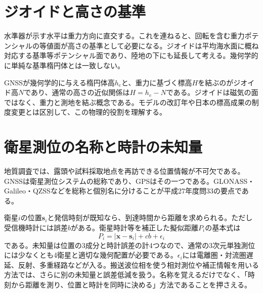 \section{ジオイドと高さの基準}
\label{theory:gravity:geoid}
水準器が示す水平は重力方向に直交する。これを連ねると、回転を含む重力ポテンシャルの等値面が高さの基準として必要になる。ジオイドは平均海水面に概ね対応する基準等ポテンシャル面であり、陸地の下にも延長して考える。幾何学的に単純な基準楕円体とは一致しない。

GNSSが幾何学的に与える楕円体高\(h_e\)と、重力に基づく標高\(H\)を結ぶのがジオイド高\(N\)であり、通常の高さの近似関係は\(H=h_e-N\)である。ジオイドは磁気の面ではなく、重力と測地を結ぶ概念である。モデルの改訂年や日本の標高成果の制度変更とは区別して、この物理的役割を理解する\cite{gsi_geoid}。

\section{衛星測位の名称と時計の未知量}
\label{theory:gravity:gnss}
地質調査では、露頭や試料採取地点を再訪できる位置情報が不可欠である。GNSSは衛星測位システムの総称であり、GPSはその一つである。GLONASS・Galileo・QZSSなどを総称と個別名に分けることが平成27年度問33の要点である\cite{gsi_gnss}。

衛星\(i\)の位置\(\boldsymbol{s}_i\)と発信時刻が既知なら、到達時間から距離を求められる。ただし受信機時計には誤差\(b\)がある。衛星時計等を補正した擬似距離\(P_i\)の基本式は
\[
 P_i=|\boldsymbol{x}-\boldsymbol{s}_i|+cb+\epsilon_i
\]
である。未知量は位置の3成分と時計誤差の計4つなので、通常の3次元単独測位には少なくとも4衛星と適切な幾何配置が必要である。\(\epsilon_i\)には電離圏・対流圏遅延、反射、多重経路などが入る。搬送波位相を使う相対測位や補正情報を用いる方法では、さらに別の未知量と誤差低減を扱う。名称を覚えるだけでなく、「時刻から距離を測り、位置と時計を同時に決める」方法であることを押さえる。

